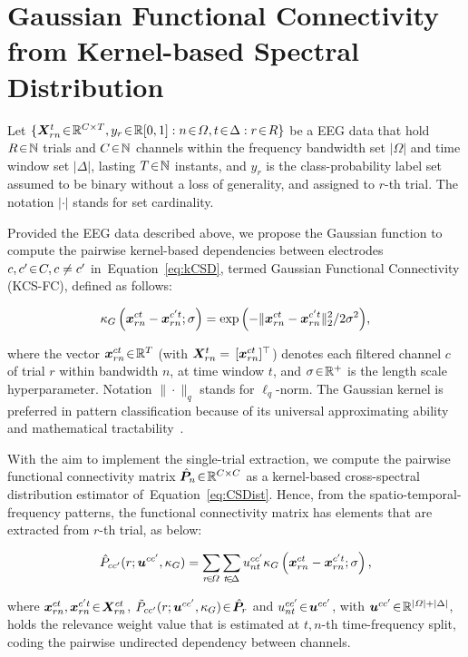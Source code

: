 \section{Gaussian Functional Connectivity from Kernel-based Spectral Distribution}

Let $\{ \mat{X}^{t}_{rn} \en \Real^{C\times T}, {y}_r \en \Real[0,1]: n\en {\varOmega}, t\en {\Delta}: r\en R\}$ be a EEG data that hold $R\negthinspace\in\negthinspace\mathbb{N}$ trials and $C\negthinspace\in\negthinspace\mathbb{N}$ channels within the frequency bandwidth set $|\varOmega|$ and time window set $| {\Delta}|$, lasting $T\negthinspace\in\negthinspace\mathbb{N}$ instants, and ${y}_r$ is the class-probability label set assumed to be binary without a loss of generality, and assigned to $r$-th trial. The notation $|\cdot|$ stands for set cardinality. 

Provided the EEG data described above, we propose {the Gaussian function to compute the pairwise kernel-based dependencies between electrodes} $c,c'\negthinspace\in\negthinspace C, c\neq c'$ in~Equation~\eqref{eq:kCSD}, termed {Gaussian Functional Connectivity} (KCS-FC), defined as follows:
\begin{linenomath*}
	\begin{align}\label{eq:gkernel}
		\kappa_G\left(\bm {x}^{ct}_{rn}-\bm {x}^{c't}_{rn};\sigma\right) = \exp{\left( {-\|\bm {x}^{ct}_{rn}-\bm {x}^{c't}_{rn}\|^2_2}/{2\sigma^2}\right)},
	\end{align}
\end{linenomath*}
where the vector $\bm {x}_{rn}^{ct}\negthinspace\in\negthinspace\mathbb{R}^{T}$ (with $\bm {X}^{t}_{rn}= \,[\bm {x}_{rn}^{ct}]^{\top}$) denotes each filtered channel $c$ of trial $r$ within bandwidth $n$, at time window $t$,  and $\sigma\negthinspace\in\negthinspace\mathbb{R}^+$ is the length scale hyperparameter. Notation $\|\cdot\|_q$ stands for $\ell_q$-norm. The Gaussian kernel is preferred in pattern classification because of its universal approximating ability and mathematical tractability~\cite{Alvarez-Meza2014}.

With the aim to implement the single-trial extraction, we compute the pairwise functional connectivity matrix $\hat{\bm {P}}_{n}\negthinspace\in\negthinspace\mathbb{R}^{C \times C}$ as a kernel-based cross-spectral distribution estimator of~Equation~\eqref{eq:CSDist}. Hence, from the spatio-temporal-frequency patterns, the functional connectivity matrix has elements that are extracted from $r$-th trial, as below:
\begin{linenomath*}
	\begin{equation}\label{eq:fcc}
		\hat{P}_{cc'}(r;\bm {u}^{cc'},\kappa_G) = \sum_{r\negthinspace\in\negthinspace\varOmega}\sum_{t\negthinspace\in\negthinspace {\Delta}} u_{nt}^{cc'}\kappa_G\left(\bm {x}^{ct}_{rn}-\bm {x}^{c't}_{rn};\sigma\right),
	\end{equation}
\end{linenomath*}
where $\bm {x}^{ct}_{rn},\bm {x}^{c't}_{rn}\negthinspace\in\negthinspace\bm {X}^{ct}_{rn}$, $\tilde{P}_{cc'}(r;\bm {u}^{cc'},\kappa_G)\negthinspace\in\negthinspace \hat{\bm {P}}_{r}$ and $u^{cc'}_{nt}\negthinspace\in\negthinspace \bm {u}^{cc'}$, with $\bm {u}^{cc'}\negthinspace\in\negthinspace\mathbb{R}^{|\varOmega|+| {\Delta}|}$, holds the relevance weight value that is estimated at $t,n$-th time-frequency split, coding the pairwise undirected dependency between channels. 

